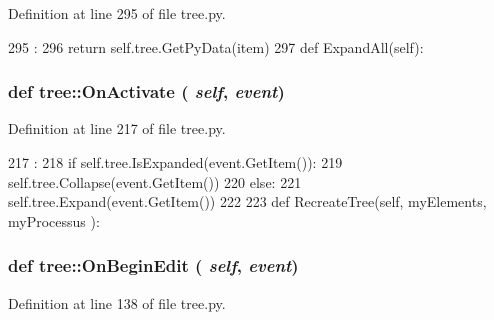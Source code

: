 Definition at line 295 of file tree.py.


\begin{DoxyCode}
295                                    :
296         return self.tree.GetPyData(item)
297             
    def ExpandAll(self):
\end{DoxyCode}
\hypertarget{namespacetree_a26991aaaa16d3bafb123acae5a0140db}{
\subsubsection[{OnActivate}]{\setlength{\rightskip}{0pt plus 5cm}def tree::OnActivate ( {\em self}, \/   {\em event})}}
\label{namespacetree_a26991aaaa16d3bafb123acae5a0140db}


Definition at line 217 of file tree.py.


\begin{DoxyCode}
217                                :
218         if self.tree.IsExpanded(event.GetItem()):
219             self.tree.Collapse(event.GetItem())
220         else:
221             self.tree.Expand(event.GetItem())
222 
223 
    def RecreateTree(self, myElements, myProcessus ):
\end{DoxyCode}
\hypertarget{namespacetree_adcce533e7fcd3c8235c26125229867c8}{
\subsubsection[{OnBeginEdit}]{\setlength{\rightskip}{0pt plus 5cm}def tree::OnBeginEdit ( {\em self}, \/   {\em event})}}
\label{namespacetree_adcce533e7fcd3c8235c26125229867c8}


Definition at line 138 of file tree.py.


